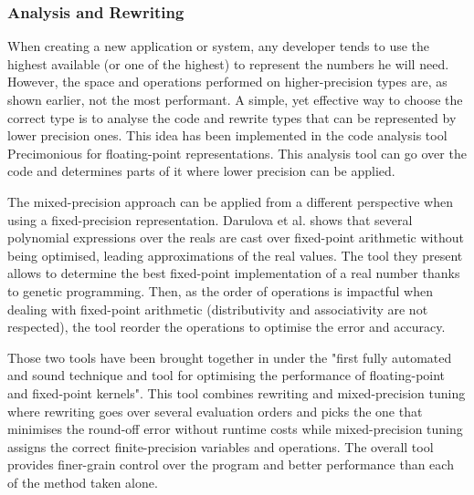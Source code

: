 \subsubsection{Analysis and Rewriting}

When creating a new application or system, any developer tends to use the highest available (or one of the highest) to represent the numbers he will need. However, the space and operations performed on higher-precision types are, as shown earlier, not the most performant. A simple, yet effective way to choose the correct type is to analyse the code and rewrite types that can be represented by lower precision ones. This idea has been implemented in the code analysis tool Precimonious \cite{Rubio2013} for floating-point representations. This analysis tool can go over the code and determines parts of it where lower precision can be applied.

The mixed-precision approach can be applied from a different perspective when using a fixed-precision representation. Darulova et al. \cite{Darulova2013} shows that several polynomial expressions over the reals are cast over fixed-point arithmetic without being optimised, leading approximations of the real values. The tool they present allows to determine the best fixed-point implementation of a real number thanks to genetic programming. Then, as the order of operations is impactful when dealing with fixed-point arithmetic (distributivity and associativity are not respected), the tool reorder the operations to optimise the error and accuracy.

Those two tools have been brought together in \cite{Darulova2018} under the "first fully automated and sound technique and tool for optimising the performance of floating-point and fixed-point kernels". This tool combines rewriting and mixed-precision tuning where rewriting goes over several evaluation orders and picks the one that minimises the round-off error without runtime costs while mixed-precision tuning assigns the correct finite-precision variables and operations. The overall tool provides finer-grain control over the program and better performance than each of the method taken alone.



